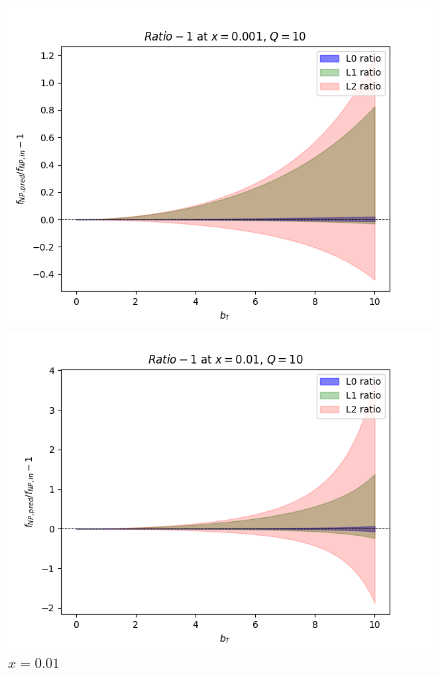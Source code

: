 \documentclass{article}
\begin{document}
\begin{itemize}
    \begin{figure}[H]
    \centering
    \begin{minipage}{0.45\textwidth}
        \centering
        \includegraphics[width=\textwidth]{Images/unc_levels/RealVsPredRatio_f_NP_Q_10_x_0.001.png}
        \caption{$x = 0.001$}
    \end{minipage}\hfill
    \begin{minipage}{0.45\textwidth}
        \centering
        \includegraphics[width=\textwidth]{Images/unc_levels/RealVsPredRatio_f_NP_Q_10_x_0.01.png}
        \caption{$x=0.01$}
    \end{minipage}
    \begin{minipage}{0.45\textwidth}
        \centering

\end{minipage}
\end{figure}
\end{itemize}
\end{document}
